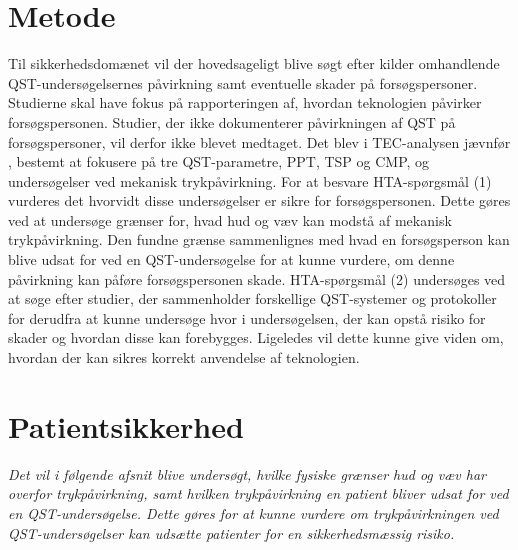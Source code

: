 \section{Metode}
Til sikkerhedsdomænet vil der hovedsageligt blive søgt efter kilder omhandlende QST-undersøgelsernes påvirkning samt eventuelle skader på forsøgspersoner. Studierne skal have fokus på rapporteringen af, hvordan teknologien påvirker forsøgspersonen. Studier, der ikke dokumenterer påvirkningen af QST på forsøgspersoner, vil derfor ikke blevet medtaget. Det blev i TEC-analysen jævnfør , bestemt at fokusere på tre QST-parametre, PPT, TSP og CMP, og undersøgelser ved mekanisk trykpåvirkning. For at besvare HTA-spørgsmål (1) vurderes det hvorvidt disse undersøgelser er sikre for forsøgspersonen. Dette gøres ved at undersøge grænser for, hvad hud og væv kan modstå af mekanisk trykpåvirkning. Den fundne grænse sammenlignes med hvad en forsøgsperson kan blive udsat for ved en QST-undersøgelse for at kunne vurdere, om denne påvirkning kan påføre forsøgspersonen skade.  HTA-spørgsmål (2) undersøges ved at søge efter studier, der sammenholder forskellige QST-systemer og protokoller for derudfra at kunne undersøge hvor i undersøgelsen, der kan opstå risiko for skader og hvordan disse kan forebygges. Ligeledes vil dette kunne give viden om, hvordan der kan sikres korrekt anvendelse af teknologien. 

\section{Patientsikkerhed}
\textit{Det vil i følgende afsnit blive undersøgt, hvilke fysiske grænser hud og væv har overfor trykpåvirkning, samt hvilken trykpåvirkning en patient bliver udsat for ved en QST-undersøgelse. Dette gøres for at kunne vurdere om trykpåvirkningen ved QST-undersøgelser kan udsætte patienter for en sikkerhedsmæssig risiko.}

